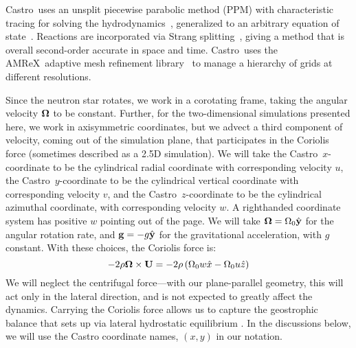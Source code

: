 \documentclass[preprint,times,tighten]{aastex63}
\newcommand{\Ub}{{\bf{U}}}
\newcommand{\Omegab}{{\bf{\Omega}}}
\newcommand{\gb}{{\bf{g}}}
\newcommand{\castro}{{\sf Castro}}
\newcommand{\amrex}{{\sf AMReX}}
\begin{document}
\castro\ uses an unsplit piecewise
parabolic method (PPM) with characteristic tracing for solving the
hydrodynamics~\citep{ppm,millercolella:2002}, generalized to an
arbitrary equation of state~\citep{zingalekatz}.  Reactions are
incorporated via Strang splitting~\citep{strang:1968}, giving a method
that is overall second-order accurate in space and time.
\castro\ uses the \amrex\ adaptive mesh refinement
library~\citep{amrex_joss} to manage a hierarchy of grids at different
resolutions.

Since the neutron star rotates, we work in a corotating frame, taking
the angular velocity $\Omegab$ to be constant.  Further, for the two-dimensional
simulations presented here, we work in axisymmetric coordinates,
but we advect a third component of velocity, coming out of the
simulation plane, that participates in the Coriolis force (sometimes
described as a 2.5D simulation).  We will take the
\castro\ $x$-coordinate to be the cylindrical radial coordinate with
corresponding velocity $u$, the \castro\ $y$-coordinate to be the
cylindrical vertical coordinate with corresponding velocity $v$, and the
\castro\ $z$-coordinate to be the cylindrical azimuthal coordinate,
with corresponding velocity $w$.  A righthanded coordinate system has
positive $w$ pointing out of the page.  We will take $\Omegab =
\Omega_0 \hat{\bf y}$ for the angular rotation rate, and $\gb = -g
\hat{\bf y}$ for the gravitational acceleration, with $g$ constant.
With these choices, the Coriolis force is:
\begin{equation}
-2\rho \Omegab \times \Ub =
   -2\rho \left ( \Omega_0 w \hat{x} - \Omega_0 u \hat{z} \right )
\end{equation}
We will neglect the centrifugal force---with our plane-parallel
geometry, this will act only in the lateral direction, and is not
expected to greatly affect the dynamics.  Carrying the Coriolis force
allows us to capture the geostrophic balance that sets up via lateral
hydrostatic equilibrium \citep{spitkovsky2002}.  In the discussions
below, we will use the Castro coordinate names, $(x, y)$ in our
notation.
\end{document}
